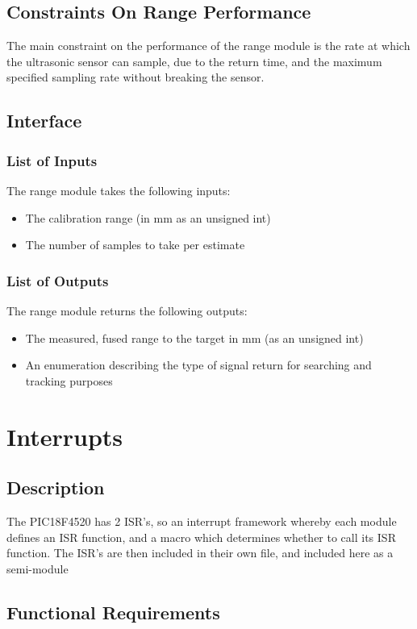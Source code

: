 \documentclass[]{report}
\begin{document}
\subsection{Constraints On Range Performance}
The main constraint on the performance of the range module is the rate at which the ultrasonic sensor can sample, due to the return time, and the maximum specified sampling rate without breaking the sensor.

\subsection{Interface}
\subsubsection{List of Inputs}
The range module takes the following inputs:
\begin{itemize}
	\item The calibration range (in mm as an unsigned int)
	\item The number of samples to take per estimate
\end{itemize}

\subsubsection{List of Outputs}
The range module returns the following outputs:
\begin{itemize}
	\item The measured, fused range to the target in mm (as an unsigned int)
	\item An enumeration describing the type of signal return for searching and tracking purposes
\end{itemize}

\section{Interrupts}
\subsection{Description}
The PIC18F4520 has 2 ISR's, so an interrupt framework whereby each module defines an ISR function, and a macro which determines whether to call its ISR function. The ISR's are then included in their own file, and included here as a semi-module

\subsection{Functional Requirements}
\end{document}
